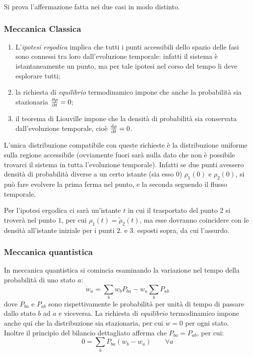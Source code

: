 Si prova l'affermazione fatta nei due casi in modo distinto.

\subsubsection{Meccanica Classica}
\begin{enumerate}
	\item L'\textit{ipotesi ergodica} implica che tutti i punti accessibili dello spazio delle fasi sono connessi tra loro dall'evoluzione temporale: infatti il sistema è istantaneamente un punto, ma per tale ipotesi nel corso del tempo li deve esplorare tutti;
	\item la richiesta di \textit{equilibrio} termodinamico impone che anche la probabilità sia stazionaria $\frac{\partial {\rho}}{\partial {t}} = 0$;
	\item il teorema di Liouville impone che la densità di probabilità sia conservata dall'evoluzione temporale, cioè $\derivative{\rho}{t} = 0$.
\end{enumerate}

\noindent L'unica distribuzione compatibile con queste richieste è la distribuzione uniforme sulla regione accessibile (ovviamente fuori sarà nulla dato che non è possibile trovarci il sistema in tutta l'evoluzione temporale). Infatti se due punti avessero densità di probabilità diverse a un certo istante (sia esso $0$) $\rho_1(0)$ e $\rho_2(0)$, si può fare evolvere la prima ferma nel punto, e la seconda seguendo il flusso temporale. 

Per l'ipotesi ergodica ci sarà un'istante $t$ in cui il trasportato del punto $2$ si troverà nel punto $1$, per cui $\rho_1(t) = \tilde{\rho}_2 (t)$, ma esse dovranno coincidere con le densità all'istante iniziale per i punti $2.$ e $3.$ esposti sopra, da cui l'assurdo.

\subsubsection{Meccanica quantistica}
In meccanica quantistica si comincia esaminando la variazione nel tempo della probabilità di uno stato $a$:
\begin{equation*}
\dot{w}_a = \sum_b w_b P_{ba} - w_a \sum_b P_{ab}
\end{equation*}
dove $P_{ba}$ e $P_{ab}$ sono rispettivamente le probabilità per unità di tempo di passare dallo stato $b$ ad $a$ e viceversa. 
La richiesta di \textit{equilibrio} termodinamico impone anche qui che la distribuzione sia stazionaria, per cui $\dot{w} = 0$ per ogni stato. 
Inoltre il principio del bilancio dettagliato afferma che $P_{ba} = P_{ab}$, per cui:
\begin{equation*}
0 = \sum_b P_{ba} (w_b - w_a) 	\qquad \forall a
\end{equation*}

